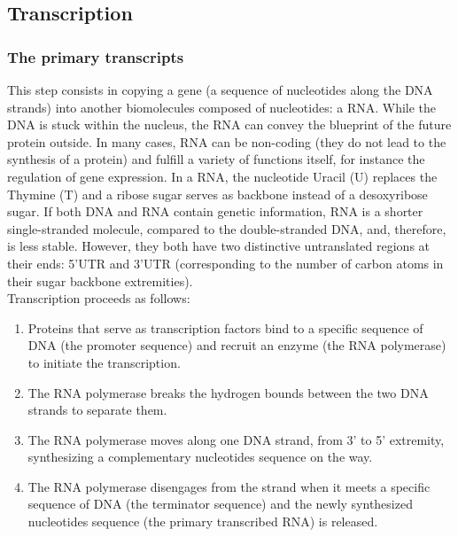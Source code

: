 \subsection{Transcription}
\label{subsec:intro_transcription}

\subsubsection{The primary transcripts}

This step consists in copying a gene (a sequence of nucleotides along the \ac{DNA} strands) into another biomolecules composed of nucleotides: a \ac{RNA}.
While the \ac{DNA} is stuck within the nucleus, the \ac{RNA} can convey the blueprint of the future protein outside.
In many cases, \ac{RNA} can be non-coding (they do not lead to the synthesis of a protein) and fulfill a variety of functions itself, for instance the regulation of gene expression.
In a \ac{RNA}, the nucleotide Uracil (U) replaces the Thymine (T) and a ribose sugar serves as backbone instead of a desoxyribose sugar.
If both \ac{DNA} and \ac{RNA} contain genetic information, \ac{RNA} is a shorter single-stranded molecule, compared to the double-stranded \ac{DNA}, and, therefore, is less stable.
However, they both have two distinctive untranslated regions at their ends: 5'UTR and 3'UTR (corresponding to the number of carbon atoms in their sugar backbone extremities).\\

\noindent
Transcription proceeds as follows:
\begin{enumerate}
	\setlength\itemsep{0.1em}
	\item Proteins that serve as transcription factors bind to a specific sequence of \ac{DNA} (the promoter sequence) and recruit an enzyme (the \ac{RNA} polymerase) to initiate the transcription.
	\item The \ac{RNA} polymerase breaks the hydrogen bounds between the two \ac{DNA} strands to separate them.
	\item The \ac{RNA} polymerase moves along one \ac{DNA} strand, from 3' to 5' extremity, synthesizing a complementary nucleotides sequence on the way.
	\item The \ac{RNA} polymerase disengages from the strand when it meets a specific sequence of \ac{DNA} (the terminator sequence) and the newly synthesized nucleotides sequence (the primary transcribed \ac{RNA}) is released.
\end{enumerate}

